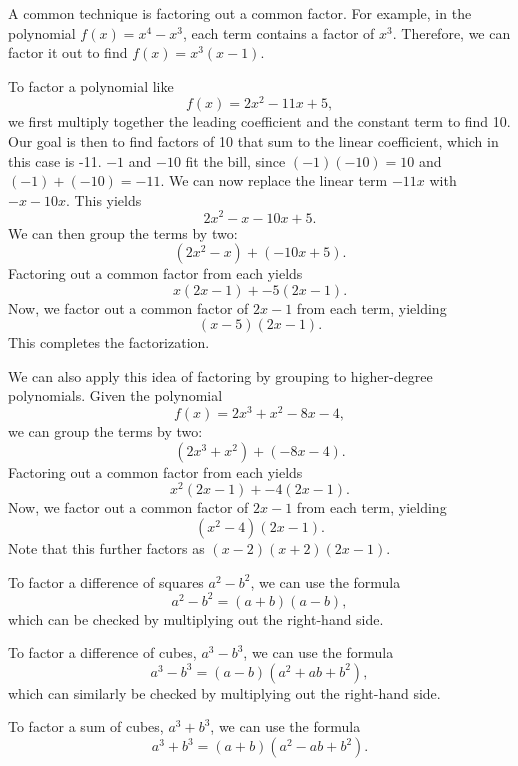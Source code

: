 \documentclass{ximera}
\begin{document}
A common technique is factoring out a common factor. For example, in the polynomial $f(x) = x^4 - x^3$, each term contains a factor of $x^3$. Therefore, we can factor it out to find $f(x) = x^3(x - 1)$. 

To factor a polynomial like $$f(x) = 2x^2 - 11x + 5,$$ we first multiply together the leading coefficient and the constant term to find 10. Our goal is then to find factors of 10 that sum to the linear coefficient, which in this case is -11. $-1$ and $-10$ fit the bill, since $(-1)(-10) = 10$ and $(-1) + (-10) = -11$. We can now replace the linear term $-11x$ with $-x - 10x$. This yields $$2x^2 - x - 10x + 5.$$ We can then group the terms by two: $$(2x^2 - x) + (-10x + 5).$$ Factoring out a common factor from each yields $$x(2x - 1) + -5(2x - 1).$$ Now, we factor out a common factor of $2x - 1$ from each term, yielding $$(x - 5)(2x - 1).$$ This completes the factorization.

We can also apply this idea of factoring by grouping to higher-degree polynomials. Given the polynomial $$f(x) = 2x^3 + x^2 - 8x - 4,$$ we can group the terms by two: $$(2x^3 + x^2) + (-8x - 4).$$ Factoring out a common factor from each yields $$x^2(2x - 1) + -4(2x - 1).$$ Now, we factor out a common factor of $2x - 1$ from each term, yielding $$(x^2 - 4)(2x - 1).$$ Note that this further factors as $(x - 2)(x + 2)(2x - 1)$. 

To factor a difference of squares $a^2 - b^2$, we can use the formula $$a^2 - b^2 = (a + b)(a - b),$$ which can be checked by multiplying out the right-hand side.

To factor a difference of cubes, $a^3 - b^3$, we can use the formula $$a^3 - b^3 = (a - b)(a^2 + ab + b^2),$$ which can similarly be checked by multiplying out the right-hand side. 

To factor a sum of cubes, $a^3 + b^3$, we can use the formula $$a^3 + b^3 = (a + b)(a^2 - ab + b^2).$$
\end{document}
